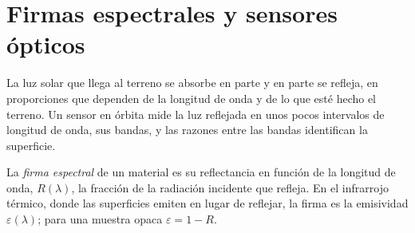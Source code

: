 \section{Firmas espectrales y sensores ópticos}\label{sec:b3:remote-sensing-gis:optical}

La luz solar que llega al terreno se absorbe en parte y en parte se refleja,
en proporciones que dependen de la longitud de onda y de lo que esté hecho el
terreno. Un sensor en órbita mide la luz reflejada en unos pocos intervalos de
longitud de onda, sus bandas, y las razones entre las bandas identifican la
superficie.

\begin{definition}\label{def:b3:remote-sensing-gis:signature}
La \emph{firma espectral} de un material es
su reflectancia en función de la longitud de onda, $R(\lambda)$, la fracción de
la radiación incidente que refleja. En el infrarrojo térmico, donde
las superficies emiten en lugar de reflejar, la firma es la emisividad
$\varepsilon(\lambda)$; para una muestra opaca $\varepsilon = 1 - R$.
\end{definition}

